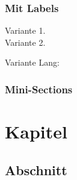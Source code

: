 \documentclass[bibtotoc,halfparskip,oneside]{scrreprt}
\begin{document}
\subsection{Mit Labels}

\lipsum[1]

\begin{description}
	\item[Variante 1.] \lipsum[3]
	\item[Variante 2.] \lipsum[3]
\end{description}

\lipsum[1]

\begin{labeling}{Variante Lang:}
	\item[Variante 1:] \lipsum[3]
	\item[Variante 2:] \lipsum[3]
	\item[Variante Lang:] \lipsum[3]
\end{labeling}

\subsection{Mini-Sections}

\lipsum[1]

\lipsum[1]

\lipsum[1]


\chapter{Kapitel}

\lipsum[1]

\section{Abschnitt}
\end{document}

